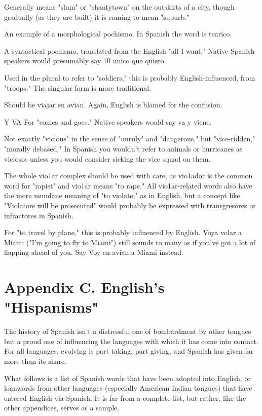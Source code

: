 { Generally means "slum" or "shantytown" on the
outskirts of a city, though gradually (as they are built) it is coming to
mean "suburb."

 An example of a morphological pochismo. In
Spanish the word is tearico.

 A syntactical pochismo, translated
from the English "all I want." Native Spanish speakers would presumably say 10 unico que quiero.

 Used in the plural to refer to "soldiers," this is
probably English-influenced, from "troops." The singular form is
more traditional.

 Should be viajar en avian. Again, English is blamed for the confusion.

 Y VA For "comes and goes." Native speakers would say
va y viene.

 Not exactly "vicious" in the sense of "unruly" and
"dangerous," but "vice-ridden," "morally debased." In Spanish you
wouldn't refer to animals or hurricanes as viciosos unless you would
consider sicking the vice squad on them.

 The whole vio1ar complex should be used with
care, as vio1ador is the common word for "rapist" and vio1ar means
"to rape." All vio1ar-related words also have the more mundane meaning of "to violate," as in English, but a concept like "Violators will be
prosecuted" would probably be expressed with transgresores or infractores in Spanish.

 For "to travel by plane," this is probably influenced
by English. Voya volar a Miami ("I'm going to fly to Miami") still
sounds to many as if you've got a lot of flapping ahead of you. Say Voy
en avian a Miami instead.

\chapter{Appendix C. English's "Hispanisms"}

The history of Spanish isn't a distressful one of bombardment
by other tongues but a proud one of influencing the languages with
which it has come into contact. For all languages, evolving is part taking, part giving, and Spanish has given far more than its share.

What follows is a list of Spanish words that have been adopted
into English, or loanwords from other languages (especially American
Indian tongues) that have entered English via Spanish. It is far from a
complete list, but rather, like the other appendices, serves as a sample.

}
